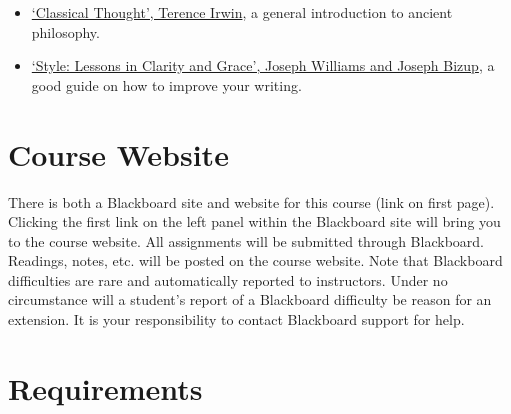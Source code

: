\documentclass[article,oneside]{memoir}
\begin{document}
\begin{itemize}
\item \href{https://www.amazon.com/Classical-Thought-History-Western-Philosophy/dp/0192891774/ref=sr_1_1?s=books&ie=UTF8&qid=1515009994&sr=1-1&keywords=classical+thought}{`Classical Thought', Terence Irwin}, a general introduction to ancient philosophy.

\item \href{http://www.amazon.com/Style-Lessons-Clarity-Grace-11th/dp/0321898680/ref=sr_1_1?ie=UTF8&qid=1452356026&sr=8-1&keywords=lessons+in+clarity+and+grace}{`Style: Lessons in Clarity and Grace', Joseph Williams and Joseph Bizup}, a good guide on how to improve your writing. 
\end{itemize}
\section{Course Website}
There is both a Blackboard site and website for this course (link on first page). Clicking the first link on the left panel within the Blackboard site will bring you to the course website. All assignments will be submitted through Blackboard. Readings, notes, etc. will be posted on the course website. Note that Blackboard difficulties are rare and automatically reported to instructors. Under no circumstance will a student's report of a Blackboard difficulty be reason for an extension. It is your responsibility to contact Blackboard support for help.


\section{Requirements}
\end{document}
